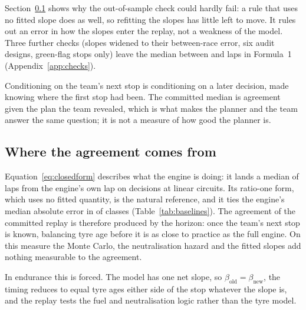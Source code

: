 \documentclass[11pt,a4paper]{article}
\begin{document}
Section~\ref{sec:designchecks} shows why the out-of-sample check could hardly
fail: a rule that uses no fitted slope does as well, so refitting the slopes
has little left to move. It rules out an error in how the slopes enter the
replay, not a weakness of the model. Three further checks (slopes widened to
their between-race error, six audit designs, green-flag stops only) leave the
median between \DesignMinMedian{} and \DesignMaxMedian{} laps in Formula~1
(Appendix~\ref{app:checks}).

Conditioning on the team's next stop is conditioning on a later decision, made
knowing where the first stop had been. The committed median is agreement given
the plan the team revealed, which is what makes the planner and the team answer
the same question; it is not a measure of how good the planner is.

\subsection{Where the agreement comes from}
\label{sec:designchecks}

Equation~\ref{eq:closedform} describes what the engine is doing: it lands a
median of \ClosedFormGap{} laps from the engine's own lap on \ClosedFormN{}
decisions at linear circuits. Its ratio-one form, which uses no fitted quantity,
is the natural reference, and it ties the engine's median absolute error in
\RatioOneTies{} of \RatioOneClasses{} classes (Table~\ref{tab:baselines}). The
agreement of the committed replay is therefore produced by the horizon: once
the team's next stop is known, balancing tyre age before it is as close to
practice as the full engine. On this measure the Monte Carlo, the
neutralisation hazard and the fitted slopes add nothing measurable to the agreement.

In endurance this is forced. The model has one net slope, so
$\beta_{\mathrm{old}} = \beta_{\mathrm{new}}$, the timing reduces to equal tyre
ages either side of the stop whatever the slope is, and the replay tests the
fuel and neutralisation logic rather than the tyre model.
\end{document}
